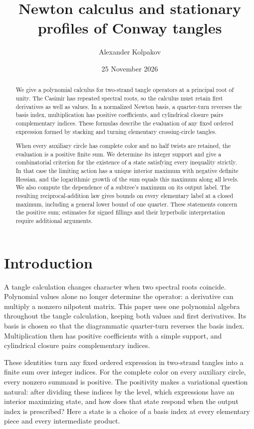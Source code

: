 \documentclass[11pt]{article}
\title{Newton calculus and stationary profiles of Conway tangles}
\author{Alexander Kolpakov}\date{25 November 2026}
\numberwithin{equation}{section}
\theoremstyle{definition}\newtheorem{definition}[theorem]{Definition}
\theoremstyle{remark}\newtheorem{remark}[theorem]{Remark}
\begin{document}
\maketitle
\begin{abstract}
We give a polynomial calculus for two-strand tangle operators at a
principal root of unity. The Casimir has repeated spectral roots, so
the calculus must retain first derivatives as well as values. In a
normalized Newton basis, a quarter-turn reverses the basis index,
multiplication has positive coefficients, and cylindrical closure pairs
complementary indices. These formulas describe the evaluation of any
fixed ordered expression formed by stacking and turning elementary
crossing-circle tangles.

When every auxiliary circle has complete color and no half twists are
retained, the evaluation is a positive finite sum. We determine its
integer support and give a combinatorial criterion for the existence of
a state satisfying every inequality strictly. In that case the limiting
action has a unique interior maximum with negative definite Hessian,
and the logarithmic growth of the sum equals this maximum along all
levels. We also compute the dependence of a subtree's maximum on its
output label. The resulting reciprocal-addition law gives bounds on
every elementary label at a closed maximum, including a general lower
bound of one quarter. These statements concern the positive sum;
estimates for signed fillings and their hyperbolic interpretation
require additional arguments.
\end{abstract}

\section{Introduction}
A tangle calculation changes character when two spectral roots
coincide. Polynomial values alone no longer determine the operator:
a derivative can multiply a nonzero nilpotent matrix. This paper uses
one polynomial algebra throughout the tangle calculation, keeping both
values and first derivatives. Its basis is chosen so that the diagrammatic
quarter-turn reverses the basis index. Multiplication then has positive
coefficients with a simple support, and cylindrical closure pairs
complementary indices.

These identities turn any fixed ordered expression in two-strand
tangles into a finite sum over integer indices. For the complete color
on every auxiliary circle, every nonzero summand is positive. The
positivity makes a variational question natural: after dividing these
indices by the level, which expressions have an interior maximizing
state, and how does that state respond when the output index is
prescribed? Here a state is a choice of a basis index at every
elementary piece and every intermediate product.
\end{document}
